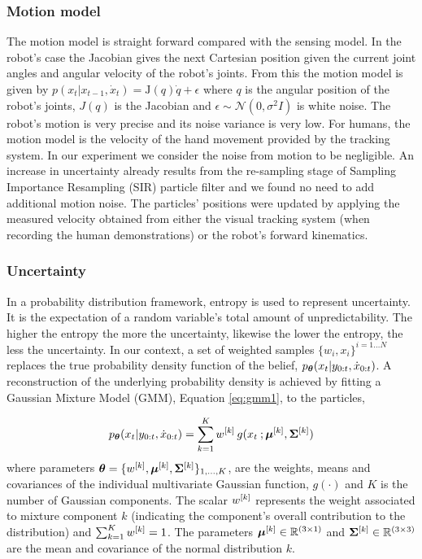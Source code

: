 \subsubsection{Motion model}

The motion model is straight forward compared with the sensing model. In the robot's case the Jacobian gives the next 
Cartesian position given the current joint angles and angular velocity of the robot's joints.
From this the motion model is given by $ p(x_{t}|x_{t-1},\dot{x}_{t}) = \mathrm{J}(q)\dot{q} + \epsilon$ where $q$ is 
the angular position of the robot's joints, $J(q)$ is the Jacobian and $\epsilon \sim \mathcal{N}(0,\sigma^{2}I)$ is white noise. 
The robot's motion is very precise and its noise variance is very low. For humans, the motion model is the velocity of the hand 
movement provided by the tracking system. In our experiment we consider the noise from motion to be negligible. An increase in 
uncertainty already results from the re-sampling stage of Sampling Importance Resampling (SIR) particle filter and we found 
no need to add additional motion noise.
The particles' positions were updated by applying the measured velocity obtained from either the visual tracking system 
(when recording the human demonstrations) or the robot's forward kinematics.

\subsubsection{Uncertainty}


In a probability distribution framework, entropy is used to represent uncertainty. It is the expectation of a 
random variable's total amount of unpredictability. The higher the entropy the more the uncertainty, likewise the 
lower the entropy, the less the uncertainty. In our context, a set of weighted samples $\{w_{i},x_{i}\}^{i=1\dots N}$ replaces 
the true probability density function of the belief, $p_{\boldsymbol{\theta}}(x_t|y_{0:t},\dot{x}_{0:t})$. A reconstruction of 
the underlying probability density is achieved by fitting a Gaussian  Mixture Model (GMM), Equation \ref{eq:gmm1}, to the particles,

\begin{equation}\label{eq:gmm1}
  p_{\boldsymbol{\theta}}(x_t|y_{0:t},\dot{x}_{0:t}) = \sum\limits_{k=1}^{K} w^{[k]}\, g(x_t\: ;\boldsymbol{\mu}^{[k]},\boldsymbol{\Sigma}^{[k]} )
\end{equation}
where parameters $\boldsymbol{\theta} = \{w^{[k]},\boldsymbol{\mu}^{[k]},\boldsymbol{\Sigma}^{[k]}\}_{1,\dots,K}$, are the weights, means and covariances of the individual multivariate Gaussian function, $g(\cdot)$ and
$K$ is the number of Gaussian components. The scalar $w^{[k]}$ represents the weight associated to mixture component $k$ 
(indicating the component's overall contribution to the distribution) and $\sum_{k=1}^{K} w^{[k]} = 1$. The parameters $\boldsymbol{\mu}^{[k]} \in \mathbb{R}^{(3\times 1)}$ 
and $\boldsymbol{\Sigma}^{[k]} \in \mathbb{R}^{(3\times 3)}$ are the mean and covariance of the normal distribution $k$. 

